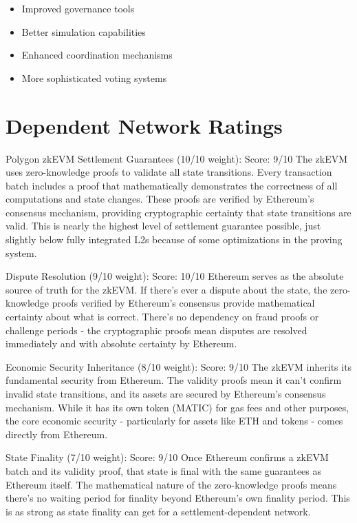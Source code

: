 \documentclass[
  letterpaper,
  DIV=11,
  numbers=noendperiod]{scrreprt}
\providecommand{\tightlist}{%
  \setlength{\itemsep}{0pt}\setlength{\parskip}{0pt}}\usepackage{longtable,booktabs,array}
\begin{document}
\begin{itemize}
\tightlist
\item
  Improved governance tools
\item
  Better simulation capabilities
\item
  Enhanced coordination mechanisms
\item
  More sophisticated voting systems
\end{itemize}

\section{Dependent Network Ratings}\label{dependent-network-ratings}

Polygon zkEVM Settlement Guarantees (10/10 weight): Score: 9/10 The
zkEVM uses zero-knowledge proofs to validate all state transitions.
Every transaction batch includes a proof that mathematically
demonstrates the correctness of all computations and state changes.
These proofs are verified by Ethereum's consensus mechanism, providing
cryptographic certainty that state transitions are valid. This is nearly
the highest level of settlement guarantee possible, just slightly below
fully integrated L2s because of some optimizations in the proving
system.

Dispute Resolution (9/10 weight): Score: 10/10 Ethereum serves as the
absolute source of truth for the zkEVM. If there's ever a dispute about
the state, the zero-knowledge proofs verified by Ethereum's consensus
provide mathematical certainty about what is correct. There's no
dependency on fraud proofs or challenge periods - the cryptographic
proofs mean disputes are resolved immediately and with absolute
certainty by Ethereum.

Economic Security Inheritance (8/10 weight): Score: 9/10 The zkEVM
inherits its fundamental security from Ethereum. The validity proofs
mean it can't confirm invalid state transitions, and its assets are
secured by Ethereum's consensus mechanism. While it has its own token
(MATIC) for gas fees and other purposes, the core economic security -
particularly for assets like ETH and tokens - comes directly from
Ethereum.

State Finality (7/10 weight): Score: 9/10 Once Ethereum confirms a zkEVM
batch and its validity proof, that state is final with the same
guarantees as Ethereum itself. The mathematical nature of the
zero-knowledge proofs means there's no waiting period for finality
beyond Ethereum's own finality period. This is as strong as state
finality can get for a settlement-dependent network.
\end{document}
